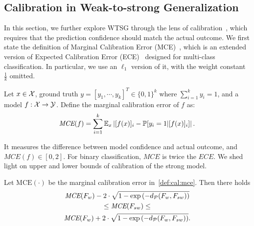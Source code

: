 \subsection{Calibration in Weak-to-strong Generalization} \label{subsec:suff_nece_condition}

In this section, we further explore WTSG through the lens of calibration~\citep{kumar2019verified}, which requires that the prediction confidence should match the actual outcome.
We first state the definition of Marginal Calibration Error (MCE)~\citep{kumar2019verified}, which is an extended version of Expected Calibration Error (ECE)~\citep{guo2017calibration} designed for multi-class classification.
In particular, we use an $\ell_1$ version of it, with the weight constant $\frac{1}{k}$ omitted.
\begin{definition} \label{def:cal:mce}
Let $x \in \mathcal{X}$, ground truth $y=[y_1, \cdots, y_k]^T \in \{ 0,1 \}^k$ where $\sum_{i=1}^k y_i=1$, and a model $f: \mathcal{X} \to \mathcal{Y}$.
Define the marginal calibration error of $f$ as:
\begin{align} \label{def:cal_err}
    \textit{MCE}(f) = \sum_{i=1}^k \mathbb{E}_x \left| [f(x)]_i-\mathbb{P}[y_i=1|[f(x)]_i] \right|.
\end{align}
\end{definition}

\vspace{-3pt}
It measures the difference between model confidence and actual outcome, and $\textit{MCE}(f) \in [0,2]$.
For binary classification, $\textit{MCE}$ is twice the $\textit{ECE}$.
We shed light on upper and lower bounds of calibration of the strong model.

\begin{theorem} \label{theorem:calibration}
Let $\text{MCE}(\cdot)$ be the marginal calibration error in~\cref{def:cal:mce}.
Then there holds
\begin{multline}
    \textit{MCE}(F_w) - 2 \cdot \sqrt{1-\exp{\left(-d_\mathcal{P}(F_w,F_{sw})\right)}} \\ \le \textit{MCE}(F_{sw}) \le \\ \textit{MCE}(F_w) + 2 \cdot \sqrt{1-\exp{\left(-d_\mathcal{P}(F_w,F_{sw})\right)}}.
\end{multline}
\end{theorem}


